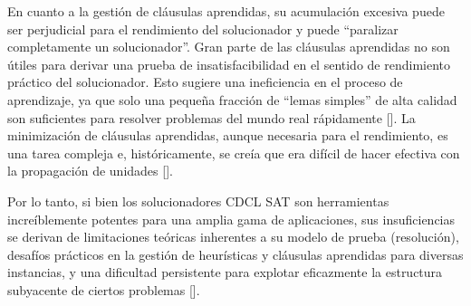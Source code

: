 En cuanto a la gesti\'on de cl\'ausulas aprendidas, su acumulación excesiva puede ser perjudicial para el rendimiento del solucionador y puede ``paralizar completamente un solucionador''. Gran parte de las cláusulas aprendidas no son útiles para derivar una prueba de insatisfacibilidad en el sentido de rendimiento práctico del solucionador. Esto sugiere una ineficiencia en el proceso de aprendizaje, ya que solo una pequeña fracción de ``lemas simples'' de alta calidad son suficientes para resolver problemas del mundo real rápidamente  [\cite{oh2016improving}]. La minimización de cláusulas aprendidas, aunque necesaria para el rendimiento, es una tarea compleja e, históricamente, se creía que era difícil de hacer efectiva con la propagación de unidades [\cite{luo2017clause_minimization}].

Por lo tanto, si bien los solucionadores CDCL SAT son herramientas increíblemente potentes para una amplia gama de aplicaciones, sus insuficiencias se derivan de limitaciones teóricas inherentes a su modelo de prueba (resolución), desafíos prácticos en la gestión de heurísticas y cláusulas aprendidas para diversas instancias, y una dificultad persistente para explotar eficazmente la estructura subyacente de ciertos problemas [\cite{ganesh_unreasonable}].






